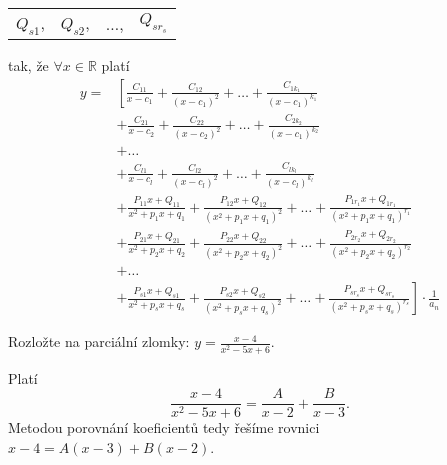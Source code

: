 \begin{veta}
\begin{center}
\begin{tabular}{l l l l}
            $Q_{s1}$, & $Q_{s2}$, & $\dots$, & $Q_{sr_s}$
        \end{tabular}
    \end{center}
    tak, že $\forall x \in \mathbb R$ platí
    \begin{align*}
        y = & \left [
              \frac{C_{11}}{x-c_1} + \frac{C_{12}}{(x-c_1)^2} +
              \dots + \frac{C_{1k_1}}{(x-c_1)^{k_1}} \right . \\
          & + \frac{C_{21}}{x-c_2} + \frac{C_{22}}{(x-c_2)^2} +
              \dots + \frac{C_{2k_2}}{(x-c_1)^{k_2}} \\
          & + \dots \\
          & + \frac{C_{l1}}{x-c_l} + \frac{C_{l2}}{(x-c_l)^2} +
              \dots + \frac{C_{lk_l}}{(x-c_l)^{k_l}} \\
          & + \frac{P_{11}x + Q_{11}}{x^2 + p_1x + q_1}
              + \frac{P_{12}x + Q_{12}}{(x^2 + p_1x + q_1)^2} + \dots
              + \frac{P_{1r_1}x + Q_{1r_1}}{(x^2 + p_1x + q_1)^{r_1}} \\
          & + \frac{P_{21}x + Q_{21}}{x^2 + p_2x + q_2}
              + \frac{P_{22}x + Q_{22}}{(x^2 + p_2x + q_2)^2} + \dots
              + \frac{P_{2r_2}x + Q_{2r_2}}{(x^2 + p_2x + q_2)^{r_2}} \\
          & + \dots \\
          & + \left . \frac{P_{s1}x + Q_{s1}}{x^2 + p_sx + q_s}
              + \frac{P_{s2}x + Q_{s2}}{(x^2 + p_sx + q_s)^2} + \dots
              + \frac{P_{sr_s}x + Q_{sr_s}}{(x^2 + p_sx + q_s)^{r_s}} \right ]
              \cdot \frac{1}{a_n}
    \end{align*}
\end{veta}

\begin{priklad}
Rozložte na parciální zlomky: $y=\frac{x-4}{x^2-5x+6}.$
\end{priklad}

\begin{reseni}
Platí
$$\frac{x-4}{x^2-5x+6}=\frac{A}{x-2}+\frac{B}{x-3}.$$
Metodou porovnání koeficientů tedy řešíme rovnici $x-4=A(x-3)+B(x-2)$.
\end{reseni}

